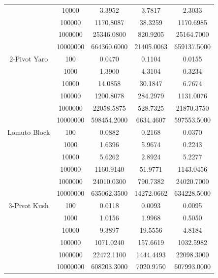 \documentclass{article}
\begin{document}
\begin{center}
\begin{tabular}{ |c c | c c c| }
                        & 10000    & 3.3952         & 3.7817        & 2.3033 \\
                        & 100000   & 1170.8087      & 38.3259       & 1170.6985 \\
                        & 1000000  & 25346.0800     & 820.9205      & 25164.7000 \\
                        & 10000000 & 664360.6000    & 21405.0063    & 659137.5000 \\
        \hline
        2-Pivot Yaro    & 100      & 0.0470         & 0.1104        & 0.0155 \\
                        & 1000     & 1.3900         & 4.3104        & 0.3234 \\
                        & 10000    & 14.0858        & 30.1847       & 6.7674 \\
                        & 100000   & 1200.8078      & 284.2979      & 1131.0076 \\
                        & 1000000  & 22058.5875     & 528.7325      & 21870.3750 \\
                        & 10000000 & 598454.2000    & 6634.4607     & 597553.5000 \\
        Lomuto Block    & 100      & 0.0882         & 0.2168        & 0.0370 \\
                        & 1000     & 1.6396         & 5.9674        & 0.2243 \\
                        & 10000    & 5.6262         & 2.8924        & 5.2277 \\
                        & 100000   & 1160.9140      & 51.9771       & 1143.0456 \\
                        & 1000000  & 24010.0300     & 790.7382      & 24020.7000 \\
                        & 10000000 & 635062.3500    & 14272.0662    & 634228.5000 \\
        \hline
        3-Pivot Kush    & 100      & 0.0118         & 0.0093        & 0.0095 \\
                        & 1000     & 1.0156         & 1.9968        & 0.5050 \\
                        & 10000    & 9.3897         & 19.5556       & 4.8184 \\
                        & 100000   & 1071.0240      & 157.6619      & 1032.5982 \\
                        & 1000000  & 22472.1100     & 1444.4493     & 22098.3000 \\
                        & 10000000 & 608203.3000    & 7020.9750     & 607993.0000 \\

\end{tabular}
\end{center}
\end{document}
